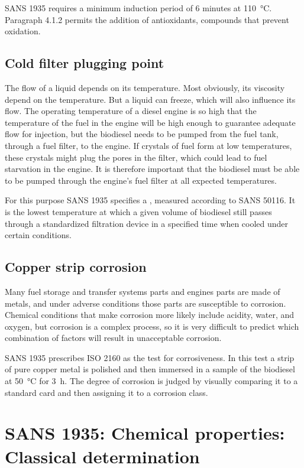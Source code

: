 SANS 1935 requires a minimum induction period of 6 minutes at
\SI{110}{\celsius}. Paragraph 4.1.2 permits the addition of antioxidants,
compounds that prevent oxidation.

\subsection{Cold filter plugging point}

The flow of a liquid depends on its temperature. Most obviously, its viscosity
depend on the temperature. But a liquid can freeze, which will also influence
its flow. The operating temperature of a diesel engine is so high that the
temperature of the fuel in the engine will be high enough to guarantee adequate
flow for injection, but the biodiesel needs to be pumped from the fuel tank,
through a fuel filter, to the engine. If crystals of fuel form at low
temperatures, these crystals might plug the pores in the filter, which could
lead to fuel starvation in the engine. It is therefore important that the
biodiesel must be able to be pumped through the engine's fuel filter at all
expected temperatures.

For this purpose SANS 1935 specifies a ,
measured according to SANS 50116. It is the lowest temperature at which a given
volume of biodiesel still passes through a standardized filtration device in a
specified time when cooled under certain conditions. 

\subsection{Copper strip corrosion}

Many fuel storage  and transfer systems parts and engines parts are made of
metals, and under adverse conditions those parts are susceptible to corrosion.
Chemical conditions that make corrosion more likely include acidity, water, and
oxygen, but corrosion is a complex process, so it is very difficult to predict
which combination of factors will result in unacceptable corrosion.

SANS 1935 prescribes ISO 2160 as the test for corrosiveness. In this test a
strip of pure copper metal is polished and then immersed in a sample of the
biodiesel at \SI{50}{\celsius} for \SI{3}{\hour}. The degree of corrosion is
judged by visually comparing it to a standard card and then assigning it to a
corrosion class.

\section{SANS 1935: Chemical properties: Classical determination}

